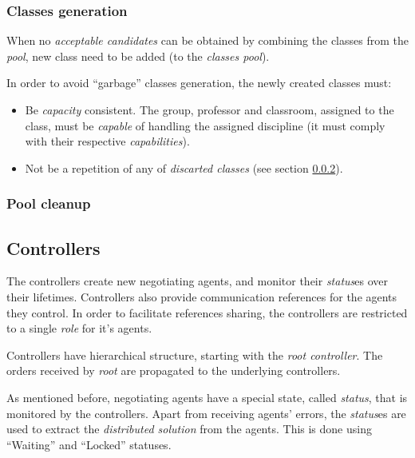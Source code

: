 \subsubsection{Classes generation}
When no \emph{acceptable candidates} can be obtained by combining the classes
from the \emph{pool}, new class need to be added (to the \emph{classes pool}).

In order to avoid ``garbage'' classes generation, the newly created classes must:
\begin{itemize}
  \item Be \emph{capacity} consistent. The group, professor and classroom,
    assigned to the class, must be \emph{capable} of handling the assigned discipline
    (it must comply with their respective \emph{capabilities}).
  \item Not be a repetition of any of \emph{discarted classes}
    (see section \ref{section:clean-pool}).
\end{itemize}


\subsubsection{Pool cleanup}
\label{section:clean-pool}





\subsection{Controllers}

The controllers create new negotiating agents, and monitor their \emph{status}es
over their lifetimes. Controllers also provide communication references for the
agents they control. In order to facilitate references sharing, the controllers
are restricted to a single \emph{role} for it's agents.

Controllers have hierarchical structure, starting with the \emph{root
  controller}. The orders received by \emph{root} are propagated to
the underlying controllers.

\medskip

As mentioned before, negotiating agents have a special state,
called \emph{status}, that is monitored by the controllers. Apart
from receiving agents' errors, the \emph{status}es are used to
extract the \emph{distributed solution} from the agents.
This is done using ``Waiting'' and ``Locked'' statuses.


